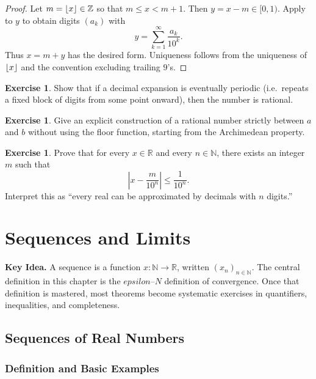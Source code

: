 \documentclass[12pt]{article}
\numberwithin{equation}{section}
\def\abs#1{|#1|}
\def\eps{epsilon}
\newcommand{\RR}{\mathbb{R}}
\newcommand{\ZZ}{\mathbb{Z}}
\newcommand{\NN}{\mathbb{N}}
\DeclarePairedDelimiter{\abs}{\lvert}{\rvert}
\DeclarePairedDelimiter{\floor}{\lfloor}{\rfloor}
\newcommand{\eps}{\varepsilon}               %
\theoremstyle{plain}
\theoremstyle{definition}
\newtheorem{exercise}[theorem]{Exercise}
\theoremstyle{remark}
\newenvironment{keyidea}{\begin{tcolorbox}\textbf{Key Idea.}}{\end{tcolorbox}}
\begin{document}
\begin{proof}
Let $m=\floor{x}\in\ZZ$ so that $m\le x<m+1$. Then $y=x-m\in[0,1)$.
Apply  to $y$ to obtain digits $(a_k)$ with
\[
y=\sum_{k=1}^{\infty}\frac{a_k}{10^k}.
\]
Thus $x=m+y$ has the desired form. Uniqueness follows from the uniqueness of $\floor{x}$ and the convention excluding trailing $9$'s.
\end{proof}

\begin{exercise}
Show that if a decimal expansion is eventually periodic (i.e.\ repeats a fixed block of digits from some point onward), then the number is rational.
\end{exercise}

\begin{exercise}
Give an explicit construction of a rational number strictly between $a$ and $b$ without using the floor function, starting from the Archimedean property.
\end{exercise}

\begin{exercise}
Prove that for every $x\in\RR$ and every $n\in\NN$, there exists an integer $m$ such that
\[
\abs{x-\frac{m}{10^n}} \le \frac{1}{10^n}.
\]
Interpret this as “every real can be approximated by decimals with $n$ digits.”
\end{exercise}

\newpage


\section{Sequences and Limits}

\begin{keyidea}
A sequence is a function $x:\NN\to\RR$, written $(x_n)_{n\in\NN}$.
The central definition in this chapter is the $\eps$--$N$ definition of convergence.
Once that definition is mastered, most theorems become systematic exercises in quantifiers, inequalities, and completeness.
\end{keyidea}

\subsection{Sequences of Real Numbers}

\subsubsection{Definition and Basic Examples}
\end{document}
